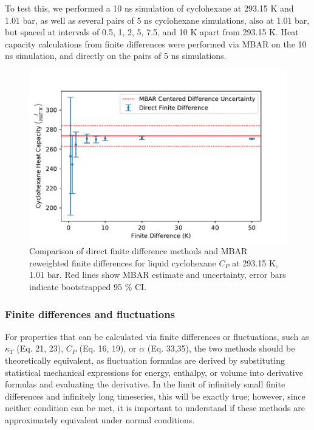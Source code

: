\documentclass[aps,pre,twocolumn,nofootinbib,superscriptaddress,linenumbers,10pt, draft,tightenlines]{revtex4-1}
\begin{document}
To test this, we performed a 10 ns simulation of cyclohexane at 293.15 K and 1.01 bar, as well as several pairs of 5 ns cyclohexane simulations, also at 1.01 bar, but spaced at intervals of 0.5, 1, 2, 5, 7.5, and 10 K apart from 293.15 K. Heat capacity calculations from finite differences were performed via MBAR on the 10 ns simulation, and directly on the pairs of 5 ns simulations. 
\begin{figure}[H]
\includegraphics[width=\textwidth-40pt]{cychex_cp_finite_diff.pdf}
\caption{Comparison of direct finite difference methods and MBAR reweighted finite differences for liquid cyclohexane $C_P$ at 293.15 K, 1.01 bar. Red lines show MBAR estimate and uncertainty, error bars indicate bootstrapped 95 \% CI.} 
\end{figure}

\subsubsection{Finite differences and fluctuations}

For properties that can be calculated via finite differences or fluctuations, such as $\kappa_T$ (Eq. 21, 23), $C_P$ (Eq. 16, 19), or $\alpha$ (Eq. 33,35), the two methods should be theoretically equivalent, as fluctuation formulas are derived by substituting statistical mechanical expressions for energy, enthalpy, or volume into derivative formulas and evaluating the derivative.  In the limit of infinitely small finite differences and infinitely long timeseries, this will be exactly true; however, since neither condition can be met, it is important to understand if these methods are approximately equivalent under normal conditions.
\end{document}
